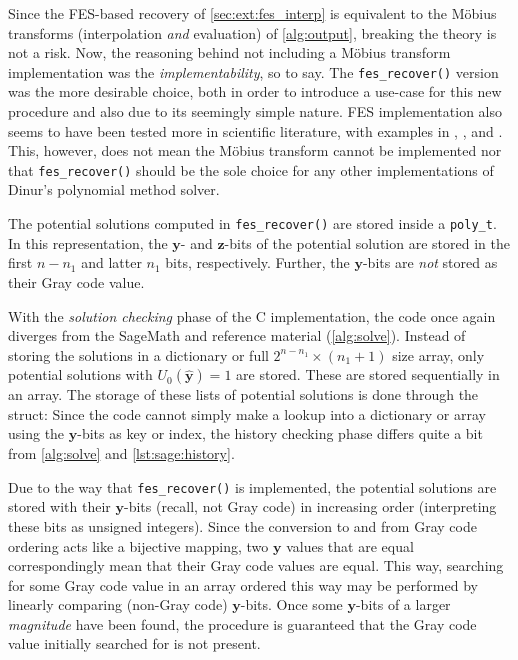 Since the FES-based recovery of \cref{sec:ext:fes_interp} is equivalent to the Möbius transforms (interpolation \textit{and} evaluation) of \cref{alg:output}, breaking the theory is not a risk. Now, the reasoning behind not including a Möbius transform implementation was the \textit{implementability}, so to say. The \texttt{fes\_recover()} version was the more desirable choice, both in order to introduce a use-case for this new procedure and also due to its seemingly simple nature. FES implementation also seems to have been tested more in scientific literature, with examples in \cite{cryptoeprint:2013/436}, \cite{cryptoeprint:2022/1412}, and \cite{ches-2010-23990}. This, however, does not mean the Möbius transform cannot be implemented nor that \texttt{fes\_recover()} should be the sole choice for any other implementations of Dinur's polynomial method solver.

The potential solutions computed in \texttt{fes\_recover()} are stored inside a \texttt{poly\_t}. In this representation, the $\mathbf{y}$- and $\mathbf{z}$-bits of the potential solution are stored in the first $n - n_1$ and latter $n_1$ bits, respectively. Further, the $\mathbf{y}$-bits are \textit{not} stored as their Gray code value.

With the \textit{solution checking} phase of the C implementation, the code once again diverges from the SageMath and reference material (\cref{alg:solve}). Instead of storing the solutions in a dictionary or full $2^{n - n_1} \times (n_1 + 1)$ size array, only potential solutions with $U_0(\hat{\mathbf{y}}) = 1$ are stored. These are stored sequentially in an array. The storage of these lists of potential solutions is done through the struct:
Since the code cannot simply make a lookup into a dictionary or array using the $\mathbf{y}$-bits as key or index, the history checking phase differs quite a bit from \cref{alg:solve} and \cref{lst:sage:history}. 

Due to the way that \texttt{fes\_recover()} is implemented, the potential solutions are stored with their $\mathbf{y}$-bits (recall, not Gray code) in increasing order (interpreting these bits as unsigned integers). Since the conversion to and from Gray code ordering acts like a bijective mapping, two $\mathbf{y}$ values that are equal correspondingly mean that their Gray code values are equal. This way, searching for some Gray code value in an array ordered this way may be performed by linearly comparing (non-Gray code) $\mathbf{y}$-bits. Once some $\mathbf{y}$-bits of a larger \textit{magnitude} have been found, the procedure is guaranteed that the Gray code value initially searched for is not present.

